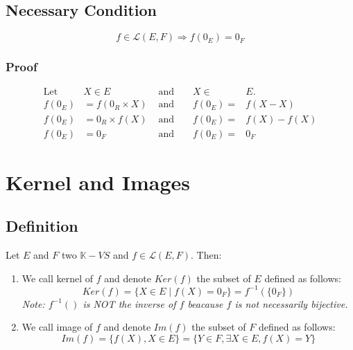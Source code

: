 \documentclass[notitlepage]{math}
\begin{document}
\subsection{Necessary Condition}
\[ f \in \mathcal{L}(E,F) \Longrightarrow f(0_E)=0_F\]
\subsubsection{Proof}
\begin{align*}
    \text{Let } &X \in E &\text{ and }  && X \in& E.\\
    f(0_E) &= f(0_R \times X)  &\text{ and } && f(0_E) =& f(X - X) \\
    f(0_E) &= 0_R \times f(X) &\text{ and } && f(0_E) =& f(X) - f(X) \\
    f(0_E) &= 0_F &\text{ and } && f(0_E) =& 0_F
\end{align*}
\section{Kernel and Images}
\subsection{Definition}
Let $E$ and $F$ two $\mathbb{K}-VS$ and $f \in \mathcal{L}(E,F)$. Then:
\begin{enumerate}
    \item We call kernel of $f$ and denote $Ker(f)$ the subset of $E$ defined as follows: 
    \[ Ker(f) = \{X \in E \mid f(X) = 0_F\} = f^{-1}(\{0_F\})\]
    \textit{Note: $f^{-1}()$ is NOT the inverse of $f$ beacause $f$ is not necessarily bijective.}
    \item We call image of $f$ and denote $Im(f)$ the subset of $F$ defined as follows:
    \[ Im(f) = \{f(X), X \in E\}=\{Y \in F, \exists X \in E, f(X) = Y\}\]
\end{enumerate}
\end{document}

